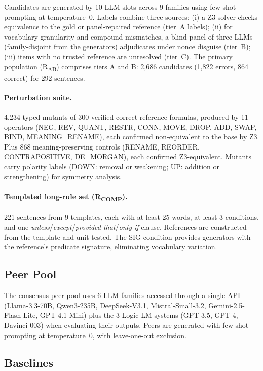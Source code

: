 \documentclass[11pt,letterpaper]{article}
\begin{document}
Candidates are generated by 10 LLM slots across 9 families using few-shot prompting at temperature~0. Labels combine three sources: (i) a Z3 solver checks equivalence to the gold or panel-repaired reference (tier~A labels); (ii) for vocabulary-granularity and compound mismatches, a blind panel of three LLMs (family-disjoint from the generators) adjudicates under nonce disguise (tier~B); (iii) items with no trusted reference are unresolved (tier~C). The primary population (R\textsubscript{AB}) comprises tiers A and B: 2,686 candidates (1,822 errors, 864 correct) for 292 sentences.

\paragraph{Perturbation suite.}
4,234 typed mutants of 300 verified-correct reference formulas, produced by 11 operators (NEG, REV, QUANT, RESTR, CONN, MOVE, DROP, ADD, SWAP, BIND, MEANING\_RENAME), each confirmed non-equivalent to the base by Z3. Plus 868 meaning-preserving controls (RENAME, REORDER, CONTRAPOSITIVE, DE\_MORGAN), each confirmed Z3-equivalent. Mutants carry polarity labels (DOWN: removal or weakening; UP: addition or strengthening) for symmetry analysis.

\paragraph{Templated long-rule set (R\textsubscript{COMP}).}
221 sentences from 9 templates, each with at least 25 words, at least 3 conditions, and one \emph{unless}/\emph{except}/\emph{provided-that}/\emph{only-if} clause. References are constructed from the template and unit-tested. The SIG condition provides generators with the reference's predicate signature, eliminating vocabulary variation.

\subsection{Peer Pool}

The consensus peer pool uses 6 LLM families accessed through a single API (Llama-3.3-70B, Qwen3-235B, DeepSeek-V3.1, Mistral-Small-3.2, Gemini-2.5-Flash-Lite, GPT-4.1-Mini) plus the 3 Logic-LM systems (GPT-3.5, GPT-4, Davinci-003) when evaluating their outputs. Peers are generated with few-shot prompting at temperature~0, with leave-one-out exclusion.

\subsection{Baselines}
\end{document}
